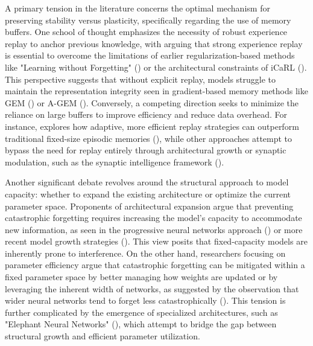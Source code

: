 \documentclass[11pt]{article}
\begin{document}
A primary tension in the literature concerns the optimal mechanism for preserving stability versus plasticity, specifically regarding the use of memory buffers. One school of thought emphasizes the necessity of robust experience replay to anchor previous knowledge, with \citep{2305.13622} arguing that strong experience replay is essential to overcome the limitations of earlier regularization-based methods like "Learning without Forgetting" (\citep{1606.09282}) or the architectural constraints of iCaRL (\citep{1611.07725}). This perspective suggests that without explicit replay, models struggle to maintain the representation integrity seen in gradient-based memory methods like GEM (\citep{1706.08840}) or A-GEM (\citep{1812.00420}). Conversely, a competing direction seeks to minimize the reliance on large buffers to improve efficiency and reduce data overhead. For instance, \citep{2308.03810} explores how adaptive, more efficient replay strategies can outperform traditional fixed-size episodic memories (\citep{1902.10486}), while other approaches attempt to bypass the need for replay entirely through architectural growth or synaptic modulation, such as the synaptic intelligence framework (\citep{1703.04200}).

Another significant debate revolves around the structural approach to model capacity: whether to expand the existing architecture or optimize the current parameter space. Proponents of architectural expansion argue that preventing catastrophic forgetting requires increasing the model's capacity to accommodate new information, as seen in the progressive neural networks approach (\citep{1606.04671}) or more recent model growth strategies (\citep{2509.01213}). This view posits that fixed-capacity models are inherently prone to interference. On the other hand, researchers focusing on parameter efficiency argue that catastrophic forgetting can be mitigated within a fixed parameter space by better managing how weights are updated or by leveraging the inherent width of networks, as suggested by the observation that wider neural networks tend to forget less catastrophically (\citep{2110.11526}). This tension is further complicated by the emergence of specialized architectures, such as "Elephant Neural Networks" (\citep{2310.01365}), which attempt to bridge the gap between structural growth and efficient parameter utilization.
\end{document}
